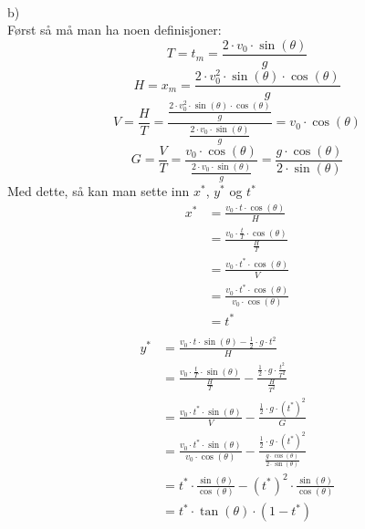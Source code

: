 \documentclass[12pt, a4paper]{article}
\begin{document}
\\
b) \\
Først så må man ha noen definisjoner:
\begin{equation*}
    T = t_m = \frac{2 \cdot v_0 \cdot \sin(\theta)}{g}
\end{equation*}
\begin{equation*}
    H = x_m = \frac{2 \cdot v_0^2 \cdot \sin(\theta) \cdot \cos(\theta)}{g}
\end{equation*}
\begin{equation*}
    V = \frac{H}{T} = \frac{\frac{2 \cdot v_0^2 \cdot \sin(\theta) \cdot \cos(\theta)}{g}}{\frac{2 \cdot v_0 \cdot \sin(\theta)}{g}} = v_0 \cdot \cos(\theta)
\end{equation*}
\begin{equation*}
    G = \frac{V}{T} = \frac{v_0 \cdot \cos(\theta)}{\frac{2 \cdot v_0 \cdot \sin(\theta)}{g}} = \frac{g \cdot \cos(\theta)}{2 \cdot \sin(\theta)}
\end{equation*}
Med dette, så kan man sette inn $x^*$, $y^*$ og $t^*$ \\
\begin{equation}
    \begin{split}
        x^* &= \frac{v_0 \cdot t \cdot \cos(\theta)}{H} \\
            &= \frac{v_0 \cdot \frac{t}{T} \cdot \cos(\theta)}{\frac{H}{T}} \\
            &= \frac{v_0 \cdot t^* \cdot \cos(\theta)}{V} \\
            &= \frac{v_0 \cdot t^* \cdot \cos(\theta)}{v_0 \cdot \cos(\theta)} \\
            &= t^* \\
    \end{split}
\end{equation}
\begin{equation*}
    \begin{split}
        y^* &= \frac{v_0 \cdot t \cdot \sin(\theta) - \frac{1}{2} \cdot g \cdot t^2 }{H} \\
            &= \frac{v_0 \cdot \frac{t}{T} \cdot \sin(\theta)}{\frac{H}{T}} - \frac{\frac{1}{2} \cdot g \cdot \frac{t^2}{T^2}}{\frac{H}{T^2}} \\
            &= \frac{v_0 \cdot t^* \cdot \sin(\theta)}{V} - \frac{\frac{1}{2} \cdot g \cdot (t^*)^2}{G} \\
            &= \frac{v_0 \cdot t^* \cdot \sin(\theta)}{v_0 \cdot \cos(\theta)} - \frac{\frac{1}{2} \cdot g \cdot (t^*)^2}{\frac{g \cdot \cos(\theta)}{2 \cdot \sin(\theta)}} \\
            &= t^* \cdot \frac{\sin(\theta)}{\cos(\theta)} - (t^*)^2 \cdot \frac{\sin(\theta)}{\cos(\theta)} \\
            &= t^* \cdot \tan(\theta) \cdot (1 - t^*)
    \end{split}
\end{equation*}
\end{document}
